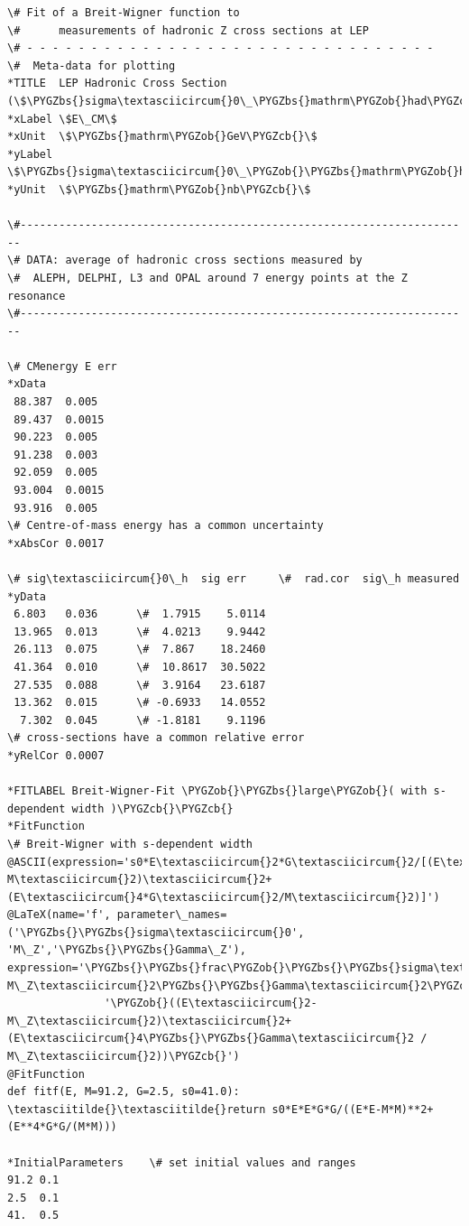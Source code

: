 \documentclass[a4paper,10pt,english]{sphinxmanual}
\def\PYGZbs{\char`\\}
\def\PYGZob{\char`\{}
\def\PYGZcb{\char`\}}
\begin{document}
\begin{Verbatim}[commandchars=\\\{\}]
\# Fit of a Breit-Wigner function to
\#      measurements of hadronic Z cross sections at LEP
\# - - - - - - - - - - - - - - - - - - - - - - - - - - - - - - - -
\#  Meta-data for plotting
*TITLE  LEP Hadronic Cross Section (\$\PYGZbs{}sigma\textasciicircum{}0\_\PYGZbs{}mathrm\PYGZob{}had\PYGZcb{}\$)
*xLabel \$E\_CM\$
*xUnit  \$\PYGZbs{}mathrm\PYGZob{}GeV\PYGZcb{}\$
*yLabel \$\PYGZbs{}sigma\textasciicircum{}0\_\PYGZob{}\PYGZbs{}mathrm\PYGZob{}had\PYGZcb{}\PYGZcb{}\$
*yUnit  \$\PYGZbs{}mathrm\PYGZob{}nb\PYGZcb{}\$

\#----------------------------------------------------------------------
\# DATA: average of hadronic cross sections measured by
\#  ALEPH, DELPHI, L3 and OPAL around 7 energy points at the Z resonance
\#----------------------------------------------------------------------

\# CMenergy E err
*xData
 88.387  0.005
 89.437  0.0015
 90.223  0.005
 91.238  0.003
 92.059  0.005
 93.004  0.0015
 93.916  0.005
\# Centre-of-mass energy has a common uncertainty
*xAbsCor 0.0017

\# sig\textasciicircum{}0\_h  sig err     \#  rad.cor  sig\_h measured
*yData
 6.803   0.036      \#  1.7915    5.0114
 13.965  0.013      \#  4.0213    9.9442
 26.113  0.075      \#  7.867    18.2460
 41.364  0.010      \#  10.8617  30.5022
 27.535  0.088      \#  3.9164   23.6187
 13.362  0.015      \# -0.6933   14.0552
  7.302  0.045      \# -1.8181    9.1196
\# cross-sections have a common relative error
*yRelCor 0.0007

*FITLABEL Breit-Wigner-Fit \PYGZob{}\PYGZbs{}large\PYGZob{}( with s-dependent width )\PYGZcb{}\PYGZcb{}
*FitFunction
\# Breit-Wigner with s-dependent width
@ASCII(expression='s0*E\textasciicircum{}2*G\textasciicircum{}2/[(E\textasciicircum{}2-M\textasciicircum{}2)\textasciicircum{}2+(E\textasciicircum{}4*G\textasciicircum{}2/M\textasciicircum{}2)]')
@LaTeX(name='f', parameter\_names=('\PYGZbs{}\PYGZbs{}sigma\textasciicircum{}0', 'M\_Z','\PYGZbs{}\PYGZbs{}Gamma\_Z'),
expression='\PYGZbs{}\PYGZbs{}frac\PYGZob{}\PYGZbs{}\PYGZbs{}sigma\textasciicircum{}0\PYGZbs{}\PYGZbs{}, M\_Z\textasciicircum{}2\PYGZbs{}\PYGZbs{}Gamma\textasciicircum{}2\PYGZcb{}'
               '\PYGZob{}((E\textasciicircum{}2-M\_Z\textasciicircum{}2)\textasciicircum{}2+(E\textasciicircum{}4\PYGZbs{}\PYGZbs{}Gamma\textasciicircum{}2 / M\_Z\textasciicircum{}2))\PYGZcb{}')
@FitFunction
def fitf(E, M=91.2, G=2.5, s0=41.0):
\textasciitilde{}\textasciitilde{}return s0*E*E*G*G/((E*E-M*M)**2+(E**4*G*G/(M*M)))

*InitialParameters    \# set initial values and ranges
91.2 0.1
2.5  0.1
41.  0.5
\end{Verbatim}
\end{document}

